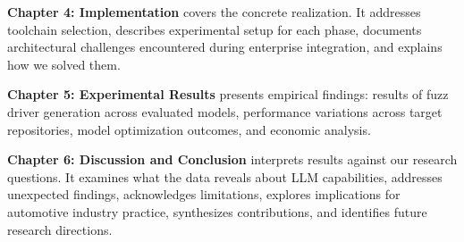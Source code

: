 \textbf{Chapter 4: Implementation} covers the concrete realization. It addresses toolchain selection, describes experimental setup for each phase, documents architectural challenges encountered during enterprise integration, and explains how we solved them.

\textbf{Chapter 5: Experimental Results} presents empirical findings: results of fuzz driver generation across evaluated models, performance variations across target repositories, model optimization outcomes, and economic analysis.

\textbf{Chapter 6: Discussion and Conclusion} interprets results against our research questions. It examines what the data reveals about LLM capabilities, addresses unexpected findings, acknowledges limitations, explores implications for automotive industry practice, synthesizes contributions, and identifies future research directions.